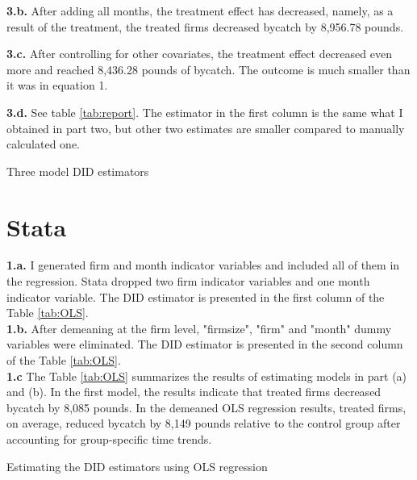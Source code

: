 \documentclass{article}
\begin{document}
\noindent \textbf{3.b.} After adding all months, the treatment effect has decreased, namely, as a result of the treatment, the treated firms decreased bycatch by 8,956.78 pounds. 

\noindent \textbf{3.c.} After controlling for other covariates, the treatment effect decreased even more and reached 8,436.28 pounds of bycatch. The outcome is much smaller than it was in equation 1. 

\noindent \textbf{3.d.} See table \ref{tab:report}. The estimator in the first column is the same what I obtained in part two, but other two estimates are smaller compared to manually calculated one. 

\begin{table}[h]
    \centering
    
    \caption{Three model DID estimators}
    \label{tab:report}
\end{table}


\section{Stata}

\noindent \textbf{1.a.} I generated firm and month indicator variables and included all of them in the regression. Stata dropped two firm indicator variables and one month indicator variable. The DID estimator is presented in the first column of the Table \ref{tab:OLS}. \\

\noindent \textbf{1.b.} After demeaning at the firm level, "firmsize", "firm" and "month" dummy variables were eliminated. The DID estimator is presented in the second column of the Table \ref{tab:OLS}. \\

\noindent \textbf{1.c} The Table \ref{tab:OLS} summarizes the results of estimating models in part (a) and (b). In the first model, the results indicate that treated firms decreased bycatch by 8,085 pounds. In the demeaned OLS regression results, treated firms, on average, reduced bycatch by 8,149 pounds relative to the control group after accounting for group-specific time trends.

\begin{table}[h]
    \centering
    
    \caption{Estimating the DID estimators using OLS regression}
    \label{tab:OLS}
\end{table}
\end{document}
